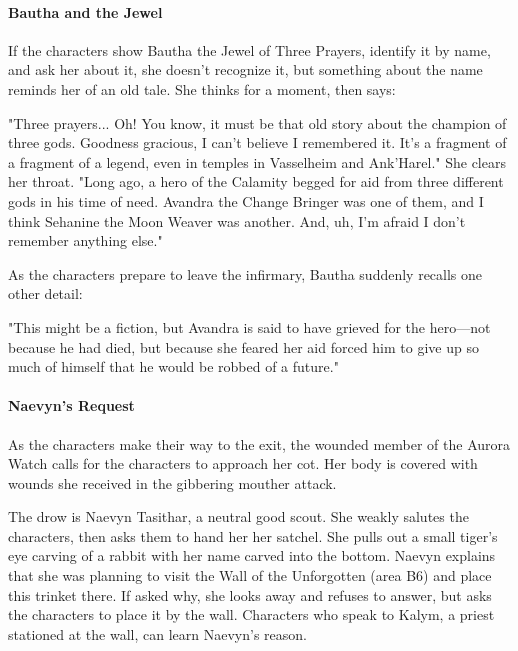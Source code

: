 \documentclass[10pt,a4paper,twoside,twocolumn,openany,nodeprecatedcode]{dndbook}
\begin{document}
\paragraph{Bautha and the Jewel}
If the characters show Bautha the Jewel of Three Prayers, identify it by name, and ask her about it, she doesn't recognize it, but something about the name reminds her of an old tale. She thinks for a moment, then says:

\begin{DndReadAloud}{}
"Three prayers... Oh! You know, it must be that old story about the champion of three gods. Goodness gracious, I can't believe I remembered it. It's a fragment of a fragment of a legend, even in temples in Vasselheim and Ank'Harel." She clears her throat. "Long ago, a hero of the Calamity begged for aid from three different gods in his time of need. Avandra the Change Bringer was one of them, and I think Sehanine the Moon Weaver was another. And, uh, I'm afraid I don't remember anything else."

\end{DndReadAloud}

As the characters prepare to leave the infirmary, Bautha suddenly recalls one other detail:

\begin{DndReadAloud}{}
"This might be a fiction, but Avandra is said to have grieved for the hero—not because he had died, but because she feared her aid forced him to give up so much of himself that he would be robbed of a future."

\end{DndReadAloud}

\paragraph{Naevyn's Request}
As the characters make their way to the exit, the wounded member of the Aurora Watch calls for the characters to approach her cot. Her body is covered with wounds she received in the gibbering mouther attack.

The drow is Naevyn Tasithar, a neutral good scout. She weakly salutes the characters, then asks them to hand her her satchel. She pulls out a small tiger's eye carving of a rabbit with her name carved into the bottom. Naevyn explains that she was planning to visit the Wall of the Unforgotten (area B6) and place this trinket there. If asked why, she looks away and refuses to answer, but asks the characters to place it by the wall. Characters who speak to Kalym, a priest stationed at the wall, can learn Naevyn's reason.
\end{document}
